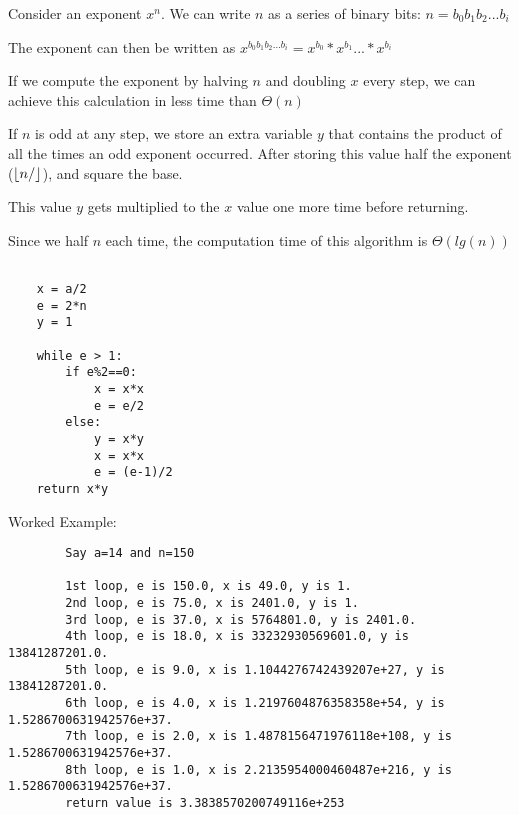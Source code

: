 \documentclass[12pt]{article}
\DeclarePairedDelimiter{\floor}{\lfloor}{\rfloor}
\newenvironment{question}[2][Question]{\begin{trivlist}
		\item[\hskip \labelsep {\bfseries #1}\hskip \labelsep {\bfseries #2.}]}{\end{trivlist}}
\begin{document}
\begin{question}{6}	

	Consider an exponent $x^n$. We can write $n$ as a series of binary bits: $n=b_0b_1b_2...b_i$
	
	The exponent can then be written as $x^{b_0b_1b_2...b_i} = x^{b_0}*x^{b_1}...*x^{b_i}$
	

	If we compute the exponent by halving
	$n$ and doubling $x$ every step, we can achieve this calculation in less time than $\Theta(n)$
	
	If $n$ is odd at any step, we store an extra variable $y$ that contains the product of all the times an odd exponent occurred. After storing this value half the exponent ($\floor{n/}$), and square the base.
	
	This value $y$ gets multiplied to the $x$ value one more time before returning. 
		
	Since we half $n$ each time, the computation time of this algorithm is $\Theta(lg(n))$	
	\begin{lstlisting}
	
	x = a/2
	e = 2*n	
	y = 1
	
	while e > 1:
		if e%2==0: 
			x = x*x
			e = e/2
		else:
			y = x*y
			x = x*x
			e = (e-1)/2
	return x*y
	\end{lstlisting}
	
	Worked Example:
		\begin{lstlisting}
		Say a=14 and n=150
				
		1st loop, e is 150.0, x is 49.0, y is 1.
		2nd loop, e is 75.0, x is 2401.0, y is 1.
		3rd loop, e is 37.0, x is 5764801.0, y is 2401.0.
		4th loop, e is 18.0, x is 33232930569601.0, y is 13841287201.0.
		5th loop, e is 9.0, x is 1.1044276742439207e+27, y is 13841287201.0.
		6th loop, e is 4.0, x is 1.2197604876358358e+54, y is 1.5286700631942576e+37.
		7th loop, e is 2.0, x is 1.4878156471976118e+108, y is 1.5286700631942576e+37.
		8th loop, e is 1.0, x is 2.2135954000460487e+216, y is 1.5286700631942576e+37.
		return value is 3.3838570200749116e+253
		\end{lstlisting}
		
	\end{question}
	
	\clearpage
	
	
	
\end{document}
